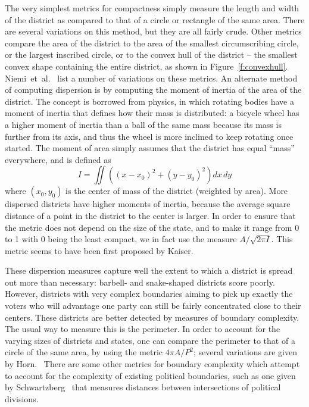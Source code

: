 \documentclass[12pt]{article}
\begin{document}
  The very simplest metrics for compactness simply measure the length and width of the district as compared to that of a circle or rectangle of the same area.  There are several variations on this method, but they are all fairly crude.  Other metrics compare the area of the district to the area of the smallest circumscribing circle, or the largest inscribed circle, or to the convex hull of the district -- the smallest convex shape containing the entire district, as shown in Figure~\ref{f:convexhull}.  Niemi~et~al.~\cite{niemi} list a number of variations on these metrics.  An alternate method of computing dispersion is by computing the moment of inertia of the area of the district.  The concept is borrowed from physics, in which rotating bodies have a moment of inertia that defines how their mass is distributed: a bicycle wheel has a higher moment of inertia than a ball of the same mass because its mass is further from its axis, and thus the wheel is more inclined to keep rotating once started.  The moment of area simply assumes that the district has equal ``mass'' everywhere, and is defined as
  \[I = \iint \left((x-x_0)^2 + (y-y_0)^2\right) dx\, dy \]
  where $(x_0, y_0)$ is the center of mass of the district (weighted by area).  More dispersed districts have higher moments of inertia, because the average square distance of a point in the district to the center is larger.  In order to ensure that the metric does not depend on the size of the state, and to make it range from 0 to 1 with 0 being the least compact, we in fact use the measure $A/\sqrt{2\pi I}$.  This metric seems to have been first proposed by Kaiser.~\cite{kaiser}

  These dispersion measures capture well the extent to which a district is spread out more than necessary: barbell- and snake-shaped districts score poorly.  However, districts with very complex boundaries aiming to pick up exactly the voters who will advantage one party can still be fairly concentrated close to their centers.  These districts are better detected by measures of boundary complexity.  The usual way to measure this is the perimeter.  In order to account for the varying sizes of districts and states, one can compare the perimeter to that of a circle of the same area, by using the metric $4\pi A/P^2$; several variations are given by Horn.~\cite{horn}  There are some other metrics for boundary complexity which attempt to account for the complexity of existing political boundaries, such as one given by Schwartzberg~\cite{schwartzberg} that measures distances between intersections of political divisions.
\end{document}
